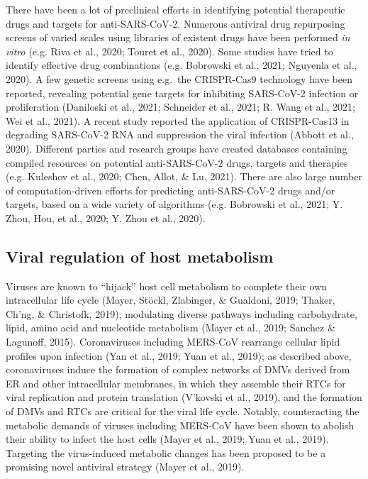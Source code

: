 \documentclass[12pt,twoside,openany,\mydriver]{thesis}  %
\begin{document}
There have been a lot of preclinical efforts in identifying potential therapeutic drugs and targets for anti-SARS-CoV-2. Numerous antiviral drug repurposing screens of varied scales using libraries of existent drugs have been performed \emph{in vitro} (e.g. Riva et al., 2020; Touret et al., 2020). Some studies have tried to identify effective drug combinations (e.g. Bobrowski et al., 2021; Nguyenla et al., 2020). A few genetic screens using e.g.~the CRISPR-Cas9 technology have been reported, revealing potential gene targets for inhibiting SARS-CoV-2 infection or proliferation (Daniloski et al., 2021; Schneider et al., 2021; R. Wang et al., 2021; Wei et al., 2021). A recent study reported the application of CRISPR-Cas13 in degrading SARS-CoV-2 RNA and suppression the viral infection (Abbott et al., 2020). Different parties and research groups have created databases containing compiled resources on potential anti-SARS-CoV-2 drugs, targets and therapies (e.g. Kuleshov et al., 2020; Chen, Allot, \& Lu, 2021). There are also large number of computation-driven efforts for predicting anti-SARS-CoV-2 drugs and/or targets, based on a wide variety of algorithms (e.g. Bobrowski et al., 2021; Y. Zhou, Hou, et al., 2020; Y. Zhou et al., 2020).

\hypertarget{intro-covid-metab}{%
\subsection{Viral regulation of host metabolism}\label{intro-covid-metab}}

Viruses are known to ``hijack'' host cell metabolism to complete their own intracellular life cycle (Mayer, Stöckl, Zlabinger, \& Gualdoni, 2019; Thaker, Ch'ng, \& Christofk, 2019), modulating diverse pathways including carbohydrate, lipid, amino acid and nucleotide metabolism (Mayer et al., 2019; Sanchez \& Lagunoff, 2015). Coronaviruses including MERS-CoV rearrange cellular lipid profiles upon infection (Yan et al., 2019; Yuan et al., 2019); as described above, coronaviruses induce the formation of complex networks of DMVs derived from ER and other intracellular membranes, in which they assemble their RTCs for viral replication and protein translation (V'kovski et al., 2019), and the formation of DMVs and RTCs are critical for the viral life cycle. Notably, counteracting the metabolic demands of viruses including MERS-CoV have been shown to abolish their ability to infect the host cells (Mayer et al., 2019; Yuan et al., 2019). Targeting the virus-induced metabolic changes has been proposed to be a promising novel antiviral strategy (Mayer et al., 2019).
\end{document}
